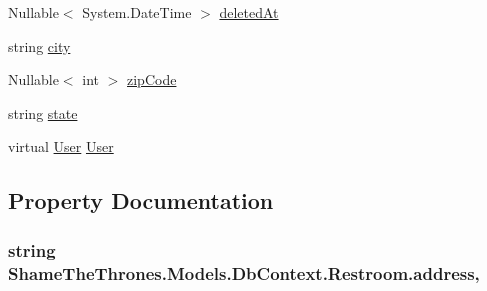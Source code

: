 \begin{DoxyCompactItemize}
\item 
Nullable$<$ System.\+Date\+Time $>$ \hyperlink{class_shame_the_thrones_1_1_models_1_1_db_context_1_1_restroom_a7c4717efd27b40e3b09b3c6f78d9a243}{deleted\+At}
\item 
string \hyperlink{class_shame_the_thrones_1_1_models_1_1_db_context_1_1_restroom_a69ce9d3cb09d53a2f5bd8192271e83a8}{city}
\item 
Nullable$<$ int $>$ \hyperlink{class_shame_the_thrones_1_1_models_1_1_db_context_1_1_restroom_abefbeef7ba0330ade218b2fcc31d3ec4}{zip\+Code}
\item 
string \hyperlink{class_shame_the_thrones_1_1_models_1_1_db_context_1_1_restroom_a2dff1c52113b9ebfa8f98df82ff382ce}{state}
\item 
virtual \hyperlink{class_shame_the_thrones_1_1_models_1_1_db_context_1_1_user}{User} \hyperlink{class_shame_the_thrones_1_1_models_1_1_db_context_1_1_restroom_afd6a5610ee1fe901f97b962a328aa12c}{User}
\end{DoxyCompactItemize}


\subsection{Property Documentation}
\subsubsection[{\texorpdfstring{address}{address}}]{\setlength{\rightskip}{0pt plus 5cm}string Shame\+The\+Thrones.\+Models.\+Db\+Context.\+Restroom.\+address\hspace{0.3cm}{\ttfamily [get]}, {\ttfamily [set]}}\hypertarget{class_shame_the_thrones_1_1_models_1_1_db_context_1_1_restroom_a5728143f63dd23c76c49f815fa61a18b}{}\label{class_shame_the_thrones_1_1_models_1_1_db_context_1_1_restroom_a5728143f63dd23c76c49f815fa61a18b}
